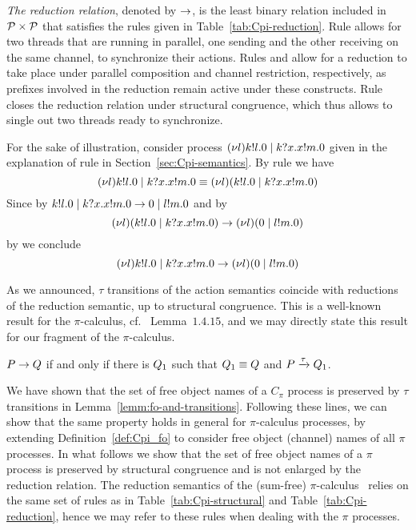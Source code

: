 \emph{The reduction relation}, denoted by $\rightarrow$, is the least binary relation included in ${\cal P}\times{\cal P}$ that satisfies the rules given in Table~\ref{tab:Cpi-reduction}. Rule  allows for two threads that are running in parallel, one sending and the other receiving on the same channel, to synchronize their actions. Rules  and  allow for a reduction to take place under parallel composition and channel restriction, respectively, as prefixes involved in the reduction remain active under these constructs. %
Rule  closes the reduction relation under structural congruence, which thus allows to single out two threads ready to synchronize. 

For the sake of illustration, consider process $(\nu l)k!l.0 \;|\;k?x.x!m.0$
given in the explanation of rule  in Section~\ref{sec:Cpi-semantics}. By rule  we have
\[
(\nu l)k!l.0 \;|\;k?x.x!m.0
\equiv
(\nu l)(k!l.0 \;|\;k?x.x!m.0)
\]
%
Since by  $k!l.0 \;|\;k?x.x!m.0\rightarrow 0 \;|\;l!m.0$ and by  
\[
(\nu l)(k!l.0 \;|\;k?x.x!m.0) \rightarrow (\nu l)(0 \;|\;l!m.0)
\]
by  we conclude
\[
(\nu l)k!l.0 \;|\;k?x.x!m.0 \rightarrow (\nu l)(0 \;|\;l!m.0)
\]



As we announced, $\tau$ transitions of the action semantics coincide with reductions of the reduction semantic, up to structural congruence. This is a well-known result for the $\pi$-calculus, cf.~\cite{pi_calculus} Lemma~$1.4.15$, and we may directly state this result for our fragment of the $\pi$-calculus.

\begin{theorem}[Harmony]\label{th:Cpi_harmony}
$P\rightarrow Q$ if and only if there is $Q_1$ such that $Q_1\equiv Q$ and $P\xrightarrow{\tau}Q_1$.
\end{theorem}


We have shown that the set of free object names of a $C_\pi$ process is preserved by $\tau$ transitions in Lemma~\ref{lemm:fo-and-transitions}. Following these lines, we can show that the same property holds in general for $\pi$-calculus processes, by extending Definition~\ref{def:Cpi_fo} to consider free object (channel) names of all $\pi$ processes. In what follows we show that the set of free object names of a $\pi$ process is preserved by structural congruence and is not enlarged by the reduction relation. The reduction semantics of the (sum-free) $\pi$-calculus~\cite{pi_calculus} relies on the same set of rules as in Table~\ref{tab:Cpi-structural} and Table~\ref{tab:Cpi-reduction}, hence we may refer to these rules when dealing with the $\pi$ processes.



